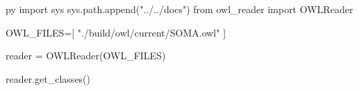 \documentclass{article}
\begin{document}
\begin{pythontexcustomcode}{py}
import sys
sys.path.append("../../docs")
from owl_reader import OWLReader

OWL_FILES=[
    "./build/owl/current/SOMA.owl"
]

reader = OWLReader(OWL_FILES)
\end{pythontexcustomcode}

\begin{multicols}{2}

\begin{pycode}
reader.get_classes()
\end{pycode}

\end{multicols}
\end{document}
